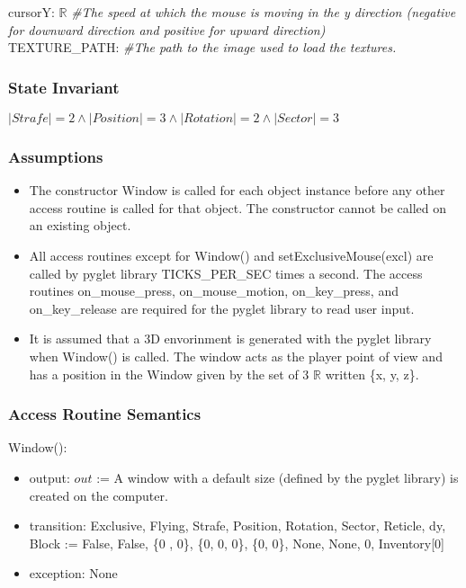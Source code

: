 \documentclass[12pt]{article}
\begin{document}
\noindent cursorY: $\mathbb{R}$\textit{ \#The speed at which the mouse is moving in the y direction (negative for downward direction and positive for upward direction)}\\

\noindent TEXTURE\_PATH: \textit{ \#The path to the image used to load the textures.}\\

\subsubsection* {State Invariant}

$|Strafe| = 2 \land |Position| = 3 \land |Rotation| = 2 \land |Sector| = 3$\\

\subsubsection* {Assumptions}

\begin{itemize}
\item The constructor Window is called for each object instance before any other
access routine is called for that object.  The constructor cannot be called on
an existing object. 

\item All access routines except for Window() and setExclusiveMouse(excl) are called by pyglet library TICKS\_PER\_SEC times a second. The access routines on\_mouse\_press, on\_mouse\_motion, on\_key\_press, and on\_key\_release are required for the pyglet library to read user input.

\item It is assumed that a 3D envorinment is generated with the pyglet library when Window() is called. The window acts as the player point of view and has a position in the Window given by the set of 3 $\mathbb{R}$ written \{x, y, z\}.
\end{itemize}
 
\subsubsection* {Access Routine Semantics}

Window():
\begin{itemize}
\item output: $out$ := A window with a default size (defined by the pyglet library) is created on the computer.
\item transition: Exclusive, Flying, Strafe, Position, Rotation, Sector, Reticle, dy, Block := False, False, \{0 , 0\}, \{0, 0, 0\}, \{0, 0\}, None, None, 0, Inventory[0]
\item exception: None\\
\end{itemize}
\end{document}
